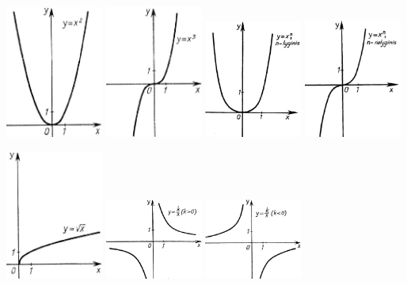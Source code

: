 \documentclass{article}
\begin{document}
\includegraphics[width=0.24\textwidth]{graph_parabola.png}
\includegraphics[width=0.24\textwidth]{graph_cubic.png}
\includegraphics[width=0.24\textwidth]{graph_evenparabola.png}
\includegraphics[width=0.24\textwidth]{graph_oddparabola.png}

\includegraphics[width=0.24\textwidth]{graph_root.png}
\includegraphics[width=0.24\textwidth]{graph_hyperbola.png}
\includegraphics[width=0.24\textwidth]{graph_downhiperbola.png}
\end{document}
